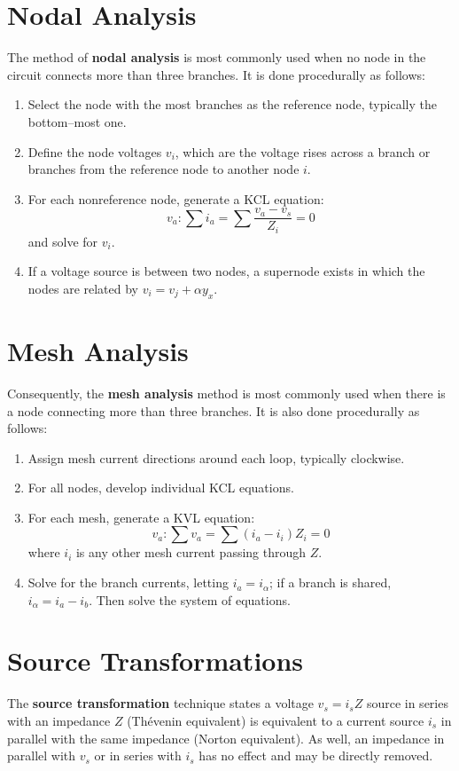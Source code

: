 \documentclass{tufte-book}
\begin{document}
\section{Nodal Analysis}
The method of \textbf{nodal analysis} is most commonly used when no node in the circuit connects more than three branches. It is done procedurally as follows:
\begin{enumerate}
  \item Select the node with the most branches as the reference node, typically the bottom--most one.
  \item Define the node voltages $v_i$, which are the voltage rises across a branch or branches from the reference node to another node $i$.
  \item For each nonreference node, generate a KCL equation: \begin{equation}
    v_a : \sum i_a = \sum \frac{v_a-v_s}{Z_i} = 0
  \end{equation}
  and solve for $v_i$.
  \item If a voltage source is between two nodes, a supernode exists in which the nodes are related by $v_i = v_j + \alpha y_x$.
\end{enumerate}

\section{Mesh Analysis}
Consequently, the \textbf{mesh analysis} method is most commonly used when there is a node connecting more than three branches. It is also done procedurally as follows:
\begin{enumerate}
  \item Assign mesh current directions around each loop, typically clockwise.
  \item For all nodes, develop individual KCL equations.
  \item For each mesh, generate a KVL equation: \begin{equation}
    v_a : \sum v_a = \sum (i_a - i_i) Z_i = 0
  \end{equation}
  where $i_i$ is any other mesh current passing through $Z$.
  \item Solve for the branch currents, letting $i_a = i_\alpha$; if a branch is shared, $i_\alpha = i_a - i_b$. Then solve the system of equations.
\end{enumerate}

\section{Source Transformations}
The \textbf{source transformation} technique states a voltage $v_s = i_sZ$ source in series with an impedance $Z$ (Thévenin equivalent) is equivalent to a current source $i_s$ in parallel with the same impedance (Norton equivalent). As well, an impedance in parallel with $v_s$ or in series with $i_s$ has no effect and may be directly removed.
\end{document}
